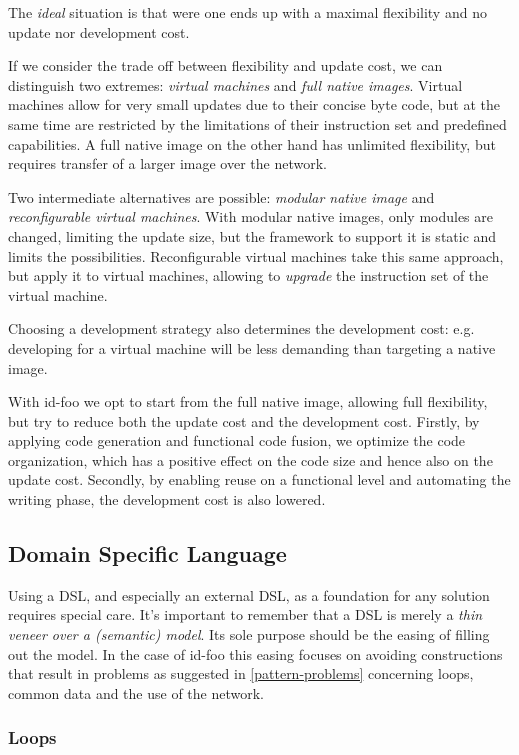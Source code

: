 \documentclass[conference]{IEEEtran}
\newcommand{\NAME}{id-foo\xspace}
\begin{document}
The \emph{ideal} situation is that were one ends up with a maximal flexibility
and no update nor development cost.

If we consider the trade off between flexibility and update cost, we can
distinguish two extremes: \emph{virtual machines} and \emph{full native
images}. Virtual machines allow for very small updates due to their concise
byte code, but at the same time are restricted by the limitations of their
instruction set and predefined capabilities. A full native image on the other
hand has unlimited flexibility, but requires transfer of a larger image over
the network.

Two intermediate alternatives are possible: \emph{modular native image} and
\emph{reconfigurable virtual machines}. With modular native images, only
modules are changed, limiting the update size, but the framework to support it
is static and limits the possibilities. Reconfigurable virtual machines take
this same approach, but apply it to virtual machines, allowing to
\emph{upgrade} the instruction set of the virtual machine.

Choosing a development strategy also determines the development cost: e.g.
developing for a virtual machine will be less demanding than targeting a native
image.

With \NAME we opt to start from the full native image, allowing full
flexibility, but try to reduce both the update cost and the development cost.
Firstly, by applying code generation and functional code fusion, we optimize
the code organization, which has a positive effect on the code size and hence
also on the update cost. Secondly, by enabling reuse on a functional level and
automating the writing phase, the development cost is also lowered.

\subsection{Domain Specific Language}
\label{dsl-design}

Using a DSL, and especially an external DSL, as a foundation for any solution
requires special care. It's important to remember that a DSL is merely a
\emph{thin veneer over a (semantic) model}\cite{fowler2010domain}. Its sole
purpose should be the easing of filling out the model. In the case of \NAME
this easing focuses on avoiding constructions that result in problems as
suggested in \ref{pattern-problems} concerning loops, common data and the use
of the network.

\subsubsection*{Loops}
\end{document}

